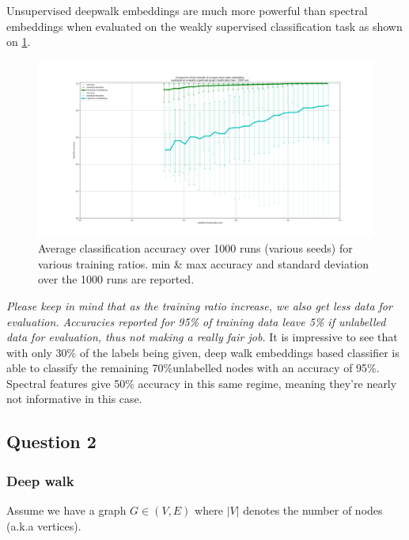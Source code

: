 \documentclass[a4paper]{article}
\begin{document}
Unsupervised deepwalk embeddings are much more powerful than spectral embeddings when evaluated on
the weakly supervised classification task as shown on \ref{fig:deepwalk_vs_laplacian_embdeddings}.
\begin{figure}[ht]
    \centering
    \includegraphics[width=1.\textwidth]{figures/deepwalk_vs_laplacian_embeddings_1000runs.png}
    \caption{Average classification accuracy over 1000 runs (various seeds) for various training ratios. 
    min \& max accuracy and standard deviation over the 1000 runs are reported.}
    \label{fig:deepwalk_vs_laplacian_embdeddings}
\end{figure}
\textit{Please keep in mind that as the training ratio increase, we also get less data for evaluation.
Accuracies reported for 95\% of training data leave 5\% if unlabelled data for evaluation,
thus not making a really fair job.} It is impressive to see that with only 30\% of the labels being given, deep walk
embeddings based classifier is able to classify the remaining 70\%unlabelled nodes with an accuracy of 95\%.
Spectral features give 50\% accuracy in this same regime, meaning they're nearly not informative in this case.



\subsection*{Question 2}
\subsubsection*{Deep walk}
Assume we have a graph $G \in (V, E)$ where $|V|$ denotes the number of nodes (a.k.a vertices). 
\end{document}
